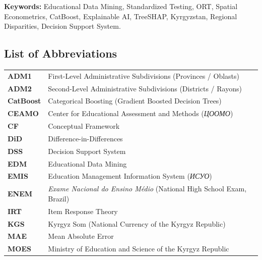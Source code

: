 \documentclass[12pt,letterpaper]{report}
\begin{document}
\vspace{0.8cm}
\begin{singlespace}
\noindent\textbf{Keywords:} Educational Data Mining, Standardized Testing, ORT, Spatial Econometrics, CatBoost, Explainable AI, TreeSHAP, Kyrgyzstan, Regional Disparities, Decision Support System.
\end{singlespace}

\newpage

\begin{singlespace}
\tableofcontents
\newpage

\listoftables
\vspace{1.5cm}
\listoffigures
\newpage

\chapter*{List of Abbreviations}
\begin{tabularx}{\textwidth}{l X}
\textbf{ADM1} & First-Level Administrative Subdivisions (Provinces / Oblasts) \\
\textbf{ADM2} & Second-Level Administrative Subdivisions (Districts / Rayons) \\
\textbf{CatBoost} & Categorical Boosting (Gradient Boosted Decision Trees) \\
\textbf{CEAMO} & Center for Educational Assessment and Methods (\textit{ЦООМО}) \\
\textbf{CF} & Conceptual Framework \\
\textbf{DiD} & Difference-in-Differences \\
\textbf{DSS} & Decision Support System \\
\textbf{EDM} & Educational Data Mining \\
\textbf{EMIS} & Education Management Information System (\textit{ИСУО}) \\
\textbf{ENEM} & \textit{Exame Nacional do Ensino Médio} (National High School Exam, Brazil) \\
\textbf{IRT} & Item Response Theory \\
\textbf{KGS} & Kyrgyz Som (National Currency of the Kyrgyz Republic) \\
\textbf{MAE} & Mean Absolute Error \\
\textbf{MOES} & Ministry of Education and Science of the Kyrgyz Republic \\

\end{tabularx}
\end{singlespace}
\end{document}
